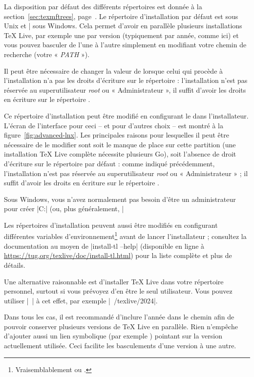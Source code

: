 \documentclass[german, english, french, 12pt]{article}
\renewcommand{\TL}{\TeX{} Live\xspace}%
\newcommand\eng[1]{\foreignlanguage{english}{\emph{#1}}}
\begin{document}
La disposition par défaut des différents répertoires est donnée à la
section~\ref{sec:texmftrees}, page~\pageref{sec:texmftrees}.  Le répertoire
d'installation par défaut est  sous Unix et
|%
sous Windows. Cela permet d'avoir en parallèle plusieurs installations \TL{},
par exemple une par version (typiquement par année, comme ici) et vous pouvez
basculer de l'une à l'autre simplement en modifiant votre chemin de recherche
(votre « \emph{PATH} »).

Il peut être nécessaire de changer la valeur de  lorsque celui
qui procède à l'installation n'a pas les droits d'écriture sur le répertoire
 : l'installation n'est pas réservée au superutilisateur
\eng{root} ou « Administrateur », il suffit d'avoir les droits en écriture sur
le répertoire .

Ce répertoire d'installation peut être modifié en configurant le
 dans l'installateur. L'écran de l'interface pour ceci -- et
pour d'autres choix -- est montré à la figure~\ref{fig:advanced-lnx}.  Les
principales raisons pour lesquelles il peut être nécessaire de le modifier sont
soit le manque de place sur cette partition (une installation \TL{} complète
nécessite plusieurs Go), soit l'absence de droit d'écriture sur le répertoire
par défaut : comme indiqué précédemment, l'installation n'est pas réservée au
superutilisateur \eng{root} ou « Administrateur » ; il suffit d'avoir les
droits en écriture sur le répertoire .

Sous Windows, vous n'avez normalement pas besoin d'être un administrateur pour
créer |C:\texlive{}| (ou, plus généralement, |%

Les répertoires d'installation peuvent aussi être modifiés en configurant
différentes variables d'environnement\footnote{Vraisemblablement
   ou .}
avant de lancer l'installateur ; consultez la documentation au moyen de
|install-tl --help| (disponible en ligne
à \url{https://tug.org/texlive/doc/install-tl.html}) pour la liste complète et
plus de détails.

Une alternative raisonnable est d'installer \TL{} dans votre répertoire
personnel, surtout si vous prévoyez d'en être le seul utilisateur. Vous pouvez
utiliser |~| à cet effet, par exemple |~/texlive/2024|.

Dans tous les cas, il est recommandé d'inclure l'année dans le chemin afin de
pouvoir conserver plusieurs versions de \TL{} en parallèle.  Rien n'empêche
d'ajouter aussi un lien symbolique (par exemple
) pointant sur la version actuellement
utilisée. Ceci facilite les basculements d'une version à une autre.
\end{document}
